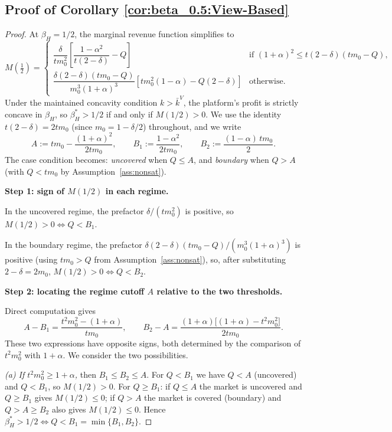 \subsection*{Proof of Corollary \ref{cor:beta_0.5:View-Based}}
\begin{proof}
At $\beta_H=1/2$, the marginal revenue function simplifies to
\begin{equation}
    M(\tfrac{1}{2}) = 
    \begin{cases}
        \dfrac{\delta}{tm_0^2} \left[ \dfrac{1-\alpha^2}{t(2-\delta)} - Q \right] & \text{if } (1 + \alpha )^2 \le t(2-\delta) (t m_0 - Q), \\[10pt]
        \dfrac{\delta (2-\delta) (t m_0 - Q)}{m_0^3(1+ \alpha)^3} \left[ t m_0^2(1-\alpha) - Q(2-\delta) \right] & \text{otherwise.}
    \end{cases}
\end{equation}
Under the maintained concavity condition $k > \bar{k}^V$, the platform's profit is strictly concave in $\beta_H$, so $\beta_H^* > 1/2$ if and only if $M(1/2) > 0$. We use the identity $t(2-\delta) = 2tm_0$ (since $m_0 = 1-\delta/2$) throughout, and we write
\[
A := tm_0 - \frac{(1+\alpha)^2}{2tm_0},
\qquad
B_1 := \frac{1-\alpha^2}{2tm_0},
\qquad
B_2 := \frac{(1-\alpha)\,tm_0}{2}.
\]
The case condition becomes: \emph{uncovered} when $Q \le A$, and \emph{boundary} when $Q > A$ (with $Q < tm_0$ by Assumption~\ref{ass:nonsat}).

\medskip
\textbf{Step 1: sign of $M(1/2)$ in each regime.}

In the uncovered regime, the prefactor $\delta/(tm_0^2)$ is positive, so $M(1/2) > 0 \iff Q < B_1$.

In the boundary regime, the prefactor $\delta(2-\delta)(tm_0-Q)/(m_0^3(1+\alpha)^3)$ is positive (using $tm_0 > Q$ from Assumption~\ref{ass:nonsat}), so, after substituting $2-\delta = 2m_0$, $M(1/2) > 0 \iff Q < B_2$.

\medskip
\textbf{Step 2: locating the regime cutoff $A$ relative to the two thresholds.}

Direct computation gives
\[
A - B_1 = \frac{t^2m_0^2 - (1+\alpha)}{tm_0},
\qquad
B_2 - A = \frac{(1+\alpha)\bigl[(1+\alpha) - t^2m_0^2\bigr]}{2tm_0}.
\]
These two expressions have opposite signs, both determined by the comparison of $t^2m_0^2$ with $1+\alpha$. We consider the two possibilities.

\emph{(a) If $t^2 m_0^2 \ge 1+\alpha$,} then $B_1 \le B_2 \le A$. For $Q < B_1$ we have $Q < A$ (uncovered) and $Q < B_1$, so $M(1/2) > 0$. For $Q \ge B_1$: if $Q \le A$ the market is uncovered and $Q \ge B_1$ gives $M(1/2) \le 0$; if $Q > A$ the market is covered (boundary) and $Q > A \ge B_2$ also gives $M(1/2) \le 0$. Hence $\beta_H^* > 1/2 \iff Q < B_1 = \min\{B_1,B_2\}$.


\end{proof}
